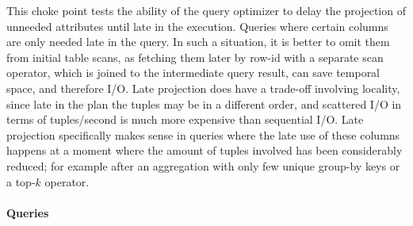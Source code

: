 
This choke point tests the ability of the query optimizer to delay the
projection of unneeded attributes until late in the execution. Queries where
certain columns are only needed late in the query. In such a situation, it is
better to omit them from initial table scans, as fetching them later by row-id
with a separate scan operator, which is joined to the intermediate query result,
can save temporal space, and therefore I/O. Late projection does have a
trade-off involving locality, since late in the plan the tuples may be in a
different order, and scattered I/O in terms of tuples/second is much more
expensive than sequential I/O. Late projection specifically makes sense in
queries where the late use of these columns happens at a moment where the amount
of tuples involved has been considerably reduced; for example after an
aggregation with only few unique group-by keys or a top-$k$ operator.


\paragraph{Queries}
{\raggedright
}